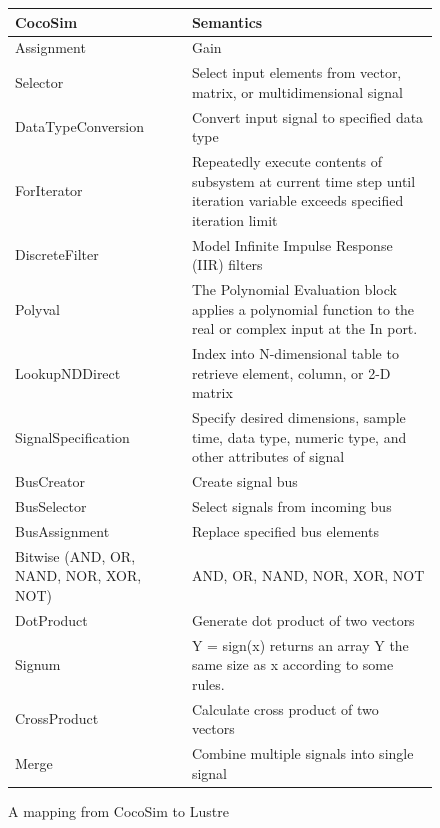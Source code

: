\documentclass{article}
\begin{document}
\begin{figure}[t]
\centering
{
\begin{tabular}{lp{6cm}}
\hline
\textbf{CocoSim} & \textbf{Semantics}  \\
\hline

Assignment &
Gain
\\

Selector &
Select input elements from vector, matrix, or multidimensional signal
\\

DataTypeConversion &
Convert input signal to specified data type
\\

ForIterator &
Repeatedly execute contents of subsystem at current time step until iteration variable exceeds specified iteration limit
\\

DiscreteFilter &
Model Infinite Impulse Response (IIR) filters
\\

Polyval &
The Polynomial Evaluation block applies a polynomial function to the real or complex input at the In port.
\\

LookupNDDirect &
Index into N-dimensional table to retrieve element, column, or 2-D matrix
\\

SignalSpecification &
Specify desired dimensions, sample time, data type, numeric type, and other attributes of signal
\\

BusCreator &
Create signal bus
\\

BusSelector &
Select signals from incoming bus
\\

BusAssignment &
Replace specified bus elements
\\

Bitwise (AND, OR, NAND, NOR, XOR, NOT) &
AND, OR, NAND, NOR, XOR, NOT
\\

DotProduct &
Generate dot product of two vectors
\\

Signum &
Y = sign(x) returns an array Y the same size as x according to some rules.
\\

CrossProduct &
Calculate cross product of two vectors
\\

Merge &
Combine multiple signals into single signal
\\

\hline
\end{tabular}
}
\caption{A mapping from CocoSim to Lustre}
\label{mapping4}
\end{figure}
\end{document}
